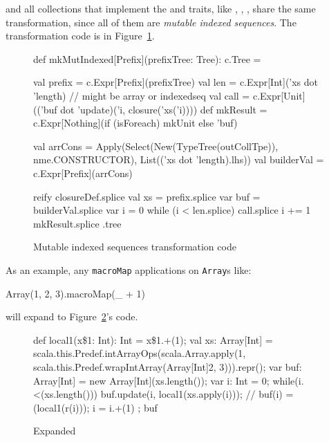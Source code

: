 and all collections that implement the 
 and 
traits, like ,
 , 
,
share the same transformation, since all of them are \emph{mutable indexed
sequences}. The transformation code is in Figure~\ref{mut_ind_transf}.

\begin{figure}
\begin{scalaCode}
def mkMutIndexed[Prefix](prefixTree: Tree): c.Tree = {
  val prefix   = c.Expr[Prefix](prefixTree)
  val len      = c.Expr[Int]('xs dot 'length) // might be array or indexedseq
  val call     = c.Expr[Unit](('buf dot 'update)('i, closure('xs('i))))
  def mkResult = c.Expr[Nothing](if (isForeach) mkUnit else 'buf)

  val arrCons  =   Apply(Select(New(TypeTree(outCollTpe)), nme.CONSTRUCTOR), List(('xs dot 'length).lhs))
  val builderVal = c.Expr[Prefix](arrCons)
  
  reify {
    closureDef.splice
    val xs = prefix.splice
    var buf = builderVal.splice
    var i  = 0
    while (i < len.splice) {
      call.splice
      i += 1
    }
    mkResult.splice
  }.tree
}
\end{scalaCode}
\caption[Mutable indexed sequences transformation code]{Mutable indexed sequences transformation code}
\label{mut_ind_transf}
\end{figure}

As an example, any \texttt{macroMap} applications on \texttt{Array}s like:
\begin{scalaCode}
Array(1, 2, 3).macroMap(\_ + 1)
\end{scalaCode}
will expand to Figure~\ref{array_expansion}'s code.

\begin{figure}
\begin{scalaCode}
{
  def local1(x\$1: Int): Int = x\$1.+(1);
  val xs: Array[Int] = scala.this.Predef.intArrayOps(scala.Array.apply(1,
scala.this.Predef.wrapIntArray(Array[Int]{2, 3}))).repr();
  var buf: Array[Int] = new Array[Int](xs.length());
  var i: Int = 0;
  while(i.<(xs.length())){
    buf.update(i, local1(xs.apply(i))); // buf(i) = (local1(r(i)));
    i = i.+(1)
  };
  buf
}
\end{scalaCode}
\caption[Expanded ]{Expanded }
\label{array_expansion}
\end{figure}

